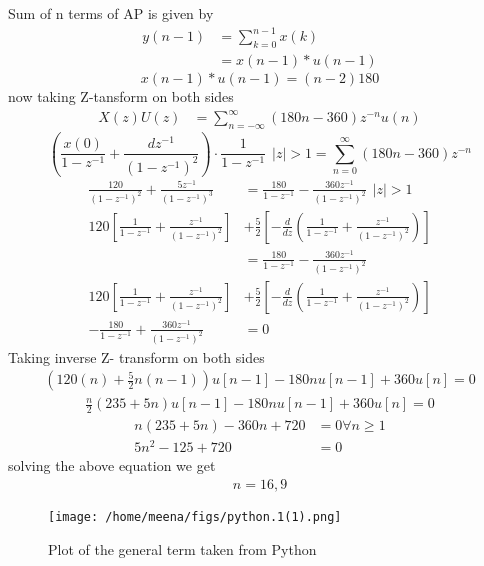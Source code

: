 \documentclass[journal,12pt,twocolumn]{IEEEtran}
\theoremstyle{remark}
\begin{document}
Sum of n terms of AP is given by
\begin{align}
    y(n-1)&=\sum_{k=0}^{n-1} x(k)\\
    &=x(n-1)*u(n-1)
\end{align}
\begin{equation}
    x(n-1)*u(n-1)=(n-2)180
\end{equation}
now taking Z-tansform on both sides
\begin{align}
    X(z)U(z)&=\sum\limits_{n=-\infty}^{\infty}(180n-360)z^{-n}u(n)
\end{align}
\begin{equation}
    \left(\frac{x(0)}{1-z^{-1}} + \frac{dz^{-1}}{(1-z^{-1})^2}\right) \cdot \frac{1}{1-z^{-1}} \hspace{5pt} \big|z| > 1 = \sum\limits_{n=0}^{\infty} (180n - 360)z^{-n}
\end{equation}
\begin{align}
    \frac{120}{(1-z^{-1})^2} + \frac{5z^{-1}}{(1-z^{-1})^3}&=\frac{180}{1-z^{-1}} - \frac{360z^{-1}}{(1-z^{-1})^2}\hspace{5pt} \big|z| > 1\\
    120 \left[\frac{1}{1-z^{-1}} + \frac{z^{-1}}{(1-z^{-1})^2}\right] &+ \frac{5}{2}\left[-\frac{d}{dz}\left(\frac{1}{1-z^{-1}} + \frac{z^{-1}}{(1-z^{-1})^2}\right)\right] \\
    &= \frac{180}{1-z^{-1}} - \frac{360z^{-1}}{(1-z^{-1})^2}
\end{align}
\begin{align}
    120 \left[\frac{1}{1-z^{-1}} + \frac{z^{-1}}{(1-z^{-1})^2}\right] &+ \frac{5}{2}\left[-\frac{d}{dz}\left(\frac{1}{1-z^{-1}} + \frac{z^{-1}}{(1-z^{-1})^2}\right)\right] \\
    - \frac{180}{1-z^{-1}} +\frac{360z^{-1}}{(1-z^{-1})^2} &= 0
\end{align}
Taking inverse Z- transform on both sides 
\begin{align}
    \left(120(n)+\frac{5}{2}n(n-1)\right)u[n-1]-180n u[n-1]+360u[n]=0
\end{align}
\begin{align}
    \frac{n}{2}\left(235 +5n \right)u[n-1]-180n u[n-1]+360u[n]=0
\end{align}
\begin{align}
    n(235+5n)-360n+720&=0 \forall n\geq 1\\
    5n^2-125+720&=0
\end{align}
solving the above equation we get
\begin{align}
   n=16,9
\end{align}
\begin{figure}[h]
  \centering
  \texttt{[image: /home/meena/figs/python.1(1).png]} 
  \captionsetup{justification=centering}
  \caption{Plot of the general term taken from Python}
  \label{fig:your_label}
\end{figure}
\end{document}
